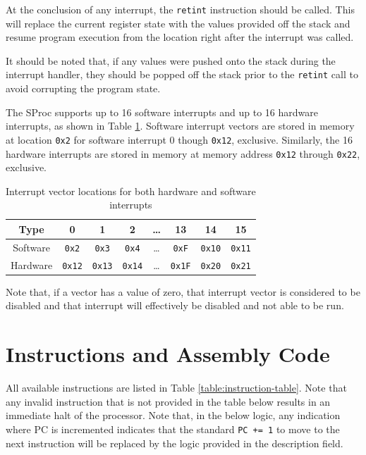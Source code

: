 \documentclass{article}
\begin{document}
At the conclusion of any interrupt, the \texttt{retint} instruction should be called. This will replace the current register state with the values provided off the stack and resume program execution from the location right after the interrupt was called.

It should be noted that, if any values were pushed onto the stack during the interrupt handler, they should be popped off the stack prior to the \texttt{retint} call to avoid corrupting the program state.

The SProc supports up to 16 software interrupts and up to 16 hardware interrupts, as shown in Table \ref{table:interrupt-vector-locations}. Software interrupt vectors are stored in memory at location \texttt{0x2} for software interrupt 0 though \texttt{0x12}, exclusive. Similarly, the 16 hardware interrupts are stored in memory at memory address \texttt{0x12} through \texttt{0x22}, exclusive.

\begin{table}[h!]
	\centering
	\begin{tabular}{c|ccccccc}
		\hline
		Type & 0 & 1 & 2 & \dots & 13 & 14 & 15 \\
		\hline
		Software & \texttt{0x2} & \texttt{0x3} & \texttt{0x4} & \dots & \texttt{0xF} & \texttt{0x10} & \texttt{0x11} \\
		Hardware & \texttt{0x12} & \texttt{0x13} & \texttt{0x14} & \dots & \texttt{0x1F} & \texttt{0x20} & \texttt{0x21} \\
		\hline
	\end{tabular}
	\caption{Interrupt vector locations for both hardware and software interrupts}
	\label{table:interrupt-vector-locations}
\end{table}

Note that, if a vector has a value of zero, that interrupt vector is considered to be disabled and that interrupt will effectively be disabled and not able to be run.

\pagebreak

\section{Instructions and Assembly Code}

All available instructions are listed in Table \ref{table:instruction-table}. Note that any invalid instruction that is not provided in the table below results in an immediate halt of the processor. Note that, in the below logic, any indication where PC is incremented indicates that the standard \texttt{PC += 1} to move to the next instruction will be replaced by the logic provided in the description field.
\end{document}
